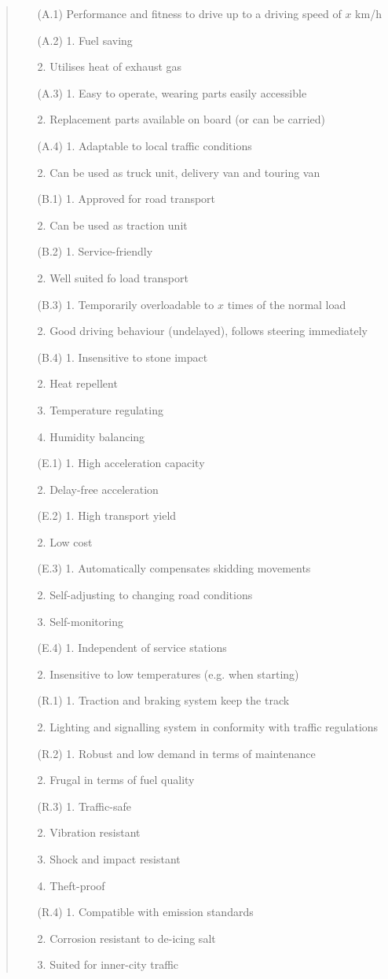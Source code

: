 \documentclass[11pt,a4paper]{article}
\begin{document}
\begin{quote}
\begin{itemize}[leftmargin=3em]
\item[(A.1)] Performance and fitness to drive up to a driving speed of $x$
  km/h
\item[(A.2)] 1. Fuel saving\par 2. Utilises heat of exhaust gas
\item[(A.3)] 1. Easy to operate, wearing parts easily accessible\par
  2. Replacement parts available on board (or can be carried)
\item[(A.4)] 1. Adaptable to local traffic conditions\par 
  2. Can be used as truck unit, delivery van and touring van
\item[(B.1)] 1. Approved for road transport\par 2. Can be used as traction unit
\item[(B.2)] 1. Service-friendly\par 2. Well suited fo load transport
\item[(B.3)] 1. Temporarily overloadable to $x$ times of the normal load\par
  2. Good driving behaviour (undelayed), follows steering immediately
\item[(B.4)] 1. Insensitive to stone impact\par 2. Heat repellent\par
  3. Temperature regulating\par 4. Humidity balancing
\item[(E.1)] 1. High acceleration capacity\par 2. Delay-free acceleration
\item[(E.2)] 1. High transport yield\par 2. Low cost
\item[(E.3)] 1. Automatically compensates skidding movements\par
  2. Self-adjusting to changing road conditions\par 3. Self-monitoring 
\item[(E.4)] 1. Independent of service stations\par 2. Insensitive to low
  temperatures (e.g. when starting)
\item[(R.1)] 1. Traction and braking system keep the track\par
  2. Lighting and signalling system in conformity with traffic regulations
\item[(R.2)] 1. Robust and low demand in terms of maintenance\par 2. Frugal in
  terms of fuel quality
\item[(R.3)] 1. Traffic-safe\par 2. Vibration resistant\par 3. Shock and
  impact resistant\par 4. Theft-proof
\item[(R.4)] 1. Compatible with emission standards\par 2. Corrosion resistant
  to de-icing salt\par 3. Suited for inner-city traffic
\end{itemize}
\end{quote}
\end{document}
